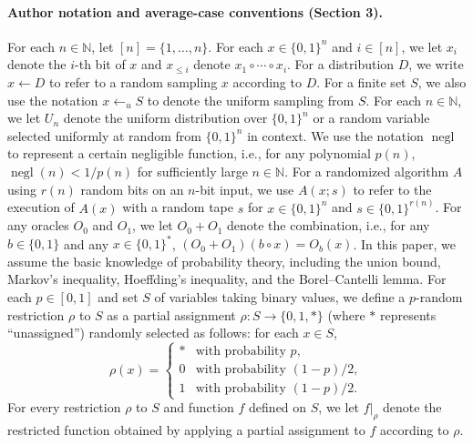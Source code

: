 \paragraph{Author notation and average-case conventions (Section 3).}
For each $n\in\mathbb N$, let $[n]=\{1,\ldots,n\}$. For each $x\in\{0,1\}^n$ and $i\in[n]$, we let $x_i$ denote the $i$-th bit of $x$ and $x_{\leq i}$ denote $x_1\circ\cdots\circ x_i$. For a distribution $D$, we write $x\leftarrow D$ to refer to a random sampling $x$ according to $D$. For a finite set $S$, we also use the notation $x\leftarrow_u S$ to denote the uniform sampling from $S$. For each $n\in\mathbb N$, we let $U_n$ denote the uniform distribution over $\{0,1\}^n$ or a random variable selected uniformly at random from $\{0,1\}^n$ in context. We use the notation $\operatorname{negl}$ to represent a certain negligible function, i.e., for any polynomial $p(n)$, $\operatorname{negl}(n)<1/p(n)$ for sufficiently large $n\in\mathbb N$. For a randomized algorithm $A$ using $r(n)$ random bits on an $n$-bit input, we use $A(x;s)$ to refer to the execution of $A(x)$ with a random tape $s$ for $x\in\{0,1\}^n$ and $s\in\{0,1\}^{r(n)}$.
For any oracles $O_0$ and $O_1$, we let $O_0+O_1$ denote the combination, i.e., for any $b\in\{0,1\}$ and any $x\in\{0,1\}^*$, $(O_0+O_1)(b\circ x)=O_b(x)$.
In this paper, we assume the basic knowledge of probability theory, including the union bound, Markov's inequality, Hoeffding's inequality, and the Borel--Cantelli lemma.
For each $p\in[0,1]$ and set $S$ of variables taking binary values, we define a $p$-random restriction $\rho$ to $S$ as a partial assignment $\rho:S\to\{0,1,*\}$ (where $*$ represents ``unassigned'') randomly selected as follows: for each $x\in S$,
\[\rho(x)=\begin{cases}*&\text{with probability }p,\\0&\text{with probability }(1-p)/2,\\1&\text{with probability }(1-p)/2.\end{cases}\]
For every restriction $\rho$ to $S$ and function $f$ defined on $S$, we let $f|_\rho$ denote the restricted function obtained by applying a partial assignment to $f$ according to $\rho$.
